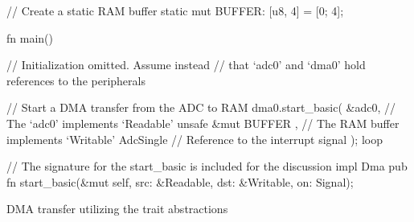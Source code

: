 \begin{listing}[H]
  \begin{rustcode}
// Create a static RAM buffer
static mut BUFFER: [u8, 4] = [0; 4];

fn main() {
  // Initialization omitted. Assume instead
  // that `adc0' and `dma0' hold references to the peripherals

  // Start a DMA transfer from the ADC to RAM
  dma0.start_basic(
    &adc0,                  // The `adc0' implements `Readable'
    unsafe { &mut BUFFER }, // The RAM buffer implements `Writable'
    AdcSingle               // Reference to the interrupt signal
  );
  loop {}
}

// The signature for the start_basic is included for the discussion
impl Dma {
  pub fn start_basic(&mut self,
                     src: &Readable, dst: &Writable, on: Signal);
}
  \end{rustcode}
  \caption{DMA transfer utilizing the trait abstractions}
  \label{lst:using:dma}
\end{listing}
